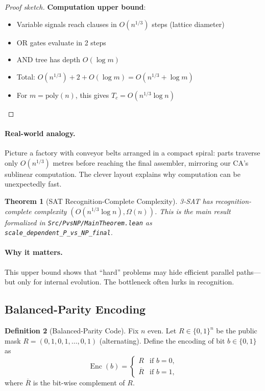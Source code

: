 \documentclass[11pt]{article}
\theoremstyle{plain}
\newtheorem{theorem}{Theorem}
\theoremstyle{definition}
\newtheorem{definition}[theorem]{Definition}
\theoremstyle{remark}
\begin{document}
\begin{proof}[Proof sketch]
\textbf{Computation upper bound}: 
\begin{itemize}
\item Variable signals reach clauses in $O(n^{1/3})$ steps (lattice diameter)
\item OR gates evaluate in 2 steps  
\item AND tree has depth $O(\log m)$
\item Total: $O(n^{1/3}) + 2 + O(\log m) = O(n^{1/3} + \log m)$
\item For $m = \text{poly}(n)$, this gives $T_c = O(n^{1/3} \log n)$
\end{itemize}
\end{proof}

\paragraph{Real-world analogy.}  Picture a factory with conveyor belts arranged in a compact spiral: parts traverse only $O(n^{1/3})$ metres before reaching the final assembler, mirroring our CA's sub\textendash linear computation.  The clever layout explains why computation can be unexpectedly fast.

\begin{theorem}[SAT Recognition-Complete Complexity]
3-SAT has recognition-complete complexity $(O(n^{1/3} \log n), \Omega(n))$. This is the main result formalized in \texttt{Src/PvsNP/MainTheorem.lean} as \texttt{scale\_dependent\_P\_vs\_NP\_final}.
\end{theorem}

\paragraph{Why it matters.}  This upper bound shows that ``hard'' problems may hide efficient parallel paths---but only for internal evolution.  The bottleneck often lurks in recognition.

\subsection{Balanced-Parity Encoding}

\begin{definition}[Balanced-Parity Code]
\label{def:balanced-parity}
Fix $n$ even. Let $R\in\{0,1\}^n$ be the public mask  
$R=(0,1,0,1,\dots,0,1)$ (alternating).  
Define the encoding of bit $b\in\{0,1\}$ as  
\[
\operatorname{Enc}(b)=
  \begin{cases}
    R &\text{if } b=0,\\
    \overline{R} &\text{if } b=1,
  \end{cases}
\]
where $\overline{R}$ is the bit-wise complement of $R$.
\end{definition}
\end{document}
